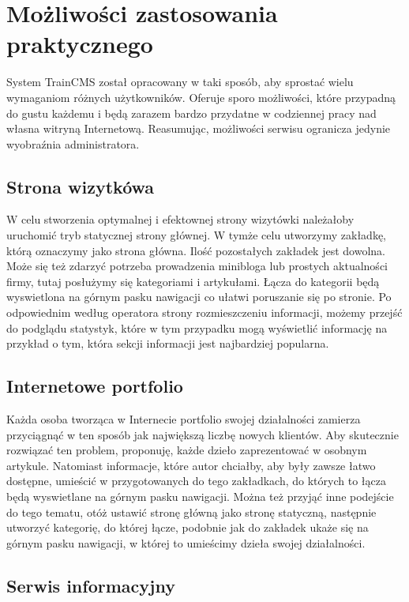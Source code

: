 \documentclass[openright]{xmgr}
\begin{document}
\newpage

\section{Możliwości zastosowania praktycznego}

System TrainCMS został opracowany w taki sposób, aby sprostać wielu wymaganiom różnych użytkowników. Oferuje sporo możliwości, które przypadną do gustu każdemu i będą zarazem bardzo przydatne w codziennej pracy nad własna witryną Internetową. Reasumując, możliwości serwisu ogranicza jedynie wyobraźnia administratora.

\subsection{Strona wizytkówa}

W celu stworzenia optymalnej i efektownej strony wizytówki należałoby uruchomić tryb statycznej strony głównej. W tymże celu utworzymy zakładkę, którą oznaczymy jako strona główna. Ilość pozostałych zakładek jest dowolna. Może się też zdarzyć potrzeba prowadzenia minibloga lub prostych aktualności firmy, tutaj posłużymy się kategoriami i artykułami. Łącza do kategorii będą wyswietlona na górnym pasku nawigacji co ułatwi poruszanie się po stronie.  Po odpowiednim według operatora strony rozmieszczeniu informacji, możemy przejść do podglądu statystyk, które w tym przypadku mogą wyświetlić informację na przykład o tym, która sekcji informacji jest najbardziej popularna. 

\subsection{Internetowe portfolio}

Każda osoba tworząca w Internecie portfolio swojej działalności zamierza przyciągnąć w ten sposób jak największą liczbę nowych klientów. Aby skutecznie rozwiązać ten problem, proponuję, każde dzieło zaprezentować w osobnym artykule. Natomiast informacje, które autor chciałby, aby były zawsze łatwo dostępne, umieścić w przygotowanych do tego zakładkach, do których to łącza będą wyswietlane na górnym pasku nawigacji. Można też przyjąć inne podejście do tego tematu, otóż ustawić stronę główną jako stronę statyczną, następnie utworzyć kategorię, do której łącze, podobnie jak do zakładek ukaże się na górnym pasku nawigacji, w której to umieścimy dzieła swojej działalności. 

\subsection{Serwis informacyjny}
\end{document}
